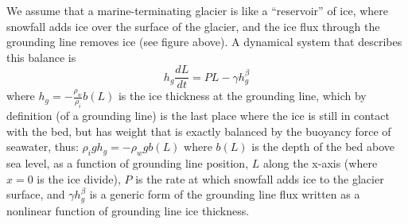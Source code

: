 \documentclass[12pt]{article}
\theoremstyle{definition}
\begin{document}
We assume that a marine-terminating glacier is like a ``reservoir'' of ice, where snowfall adds ice over the surface of the glacier, and the ice flux through the grounding line removes ice (see figure above). A dynamical system that describes this balance is
\begin{equation}
h_g \frac{dL}{dt} = PL - \gamma h_g^\beta
\end{equation}
where $h_g  = -\frac{\rho_w}{\rho_i} b(L)$ is the ice thickness at the grounding line, which by definition (of a grounding line) is the last place where the ice is still in contact with the bed, but has weight that is exactly balanced by the buoyancy force of seawater, thus: $\rho_i g h_g = -\rho_w g b(L)$ where $b(L)$ is the depth of the bed above sea level, as a function of grounding line position, $L$ along the x-axis (where $x=0$ is the ice divide), $P$ is the rate at which snowfall adds ice to the glacier surface, and $\gamma h_g^\beta$ is a generic form of the grounding line flux written as a nonlinear function of grounding line ice thickness.
\end{document}
